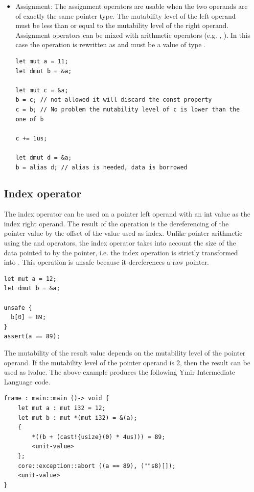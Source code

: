\begin{itemize}
\item Assignment: The assignment operators are usable when the two operands
  are of exactly the same pointer type. The mutability level of the left operand
  must be less than or equal to the mutability level of the right operand.
  Assignment operators can be mixed with arithmetic operators (e.g. \token{+=},
  \token{-=}). In this case the operation is rewritten as 
  and  must be a value of type .

  \begin{lstlisting}[style=coloredverbatimError]
let mut a = 11;
let dmut b = &a;

let mut c = &a;
b = c; // not allowed it will discard the const property
c = b; // No problem the mutability level of c is lower than the one of b

c += 1us;

let dmut d = &a;
b = alias d; // alias is needed, data is borrowed
  \end{lstlisting}

\end{itemize}

\subsection{Index operator}

The index operator can be used on a pointer left operand with an int value as
the index right operand. The result of the operation is the dereferencing of the
pointer value by the offset of the value used as index. Unlike pointer
arithmetic using the \token{+} and \token{-} operators, the index operator
takes into account the size of the data pointed to by the pointer, i.e. the
index operation  is strictly transformed into . This operation is unsafe
because it dereferences a raw pointer.

\smallskip

\begin{lstlisting}[style=coloredverbatim]
let mut a = 12;
let dmut b = &a;

unsafe {
  b[0] = 89;
}
assert(a == 89);
\end{lstlisting}

\smallskip

The mutability of the result value depends on the mutability level of the
pointer operand. If the mutability level of the pointer operand is 2, then the
result can be used as lvalue. The above example produces the following Ymir Intermediate Language code.

\begin{lstlisting}[style=myilVerb]
frame : main::main ()-> void {
    let mut a : mut i32 = 12;
    let mut b : mut *(mut i32) = &(a);
    {
        *((b + (cast!{usize}(0) * 4us))) = 89;
        <unit-value>
    };
    core::exception::abort ((a == 89), (""s8)[]);
    <unit-value>
}
\end{lstlisting}

\vfill%
\pagebreak
